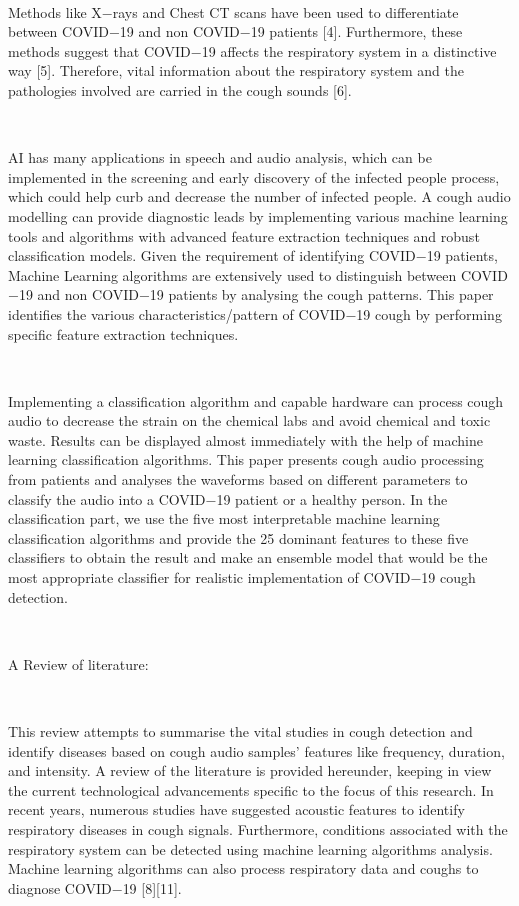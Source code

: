 \documentclass[11pt]{article}
\begin{document}
\textcolor[HTML]{0E101A}{ }

\textcolor[HTML]{0E101A}{Methods like X$-$rays and Chest CT scans have been used to differentiate between COVID$-$19 and non COVID$-$19 patients [4]. Furthermore, these methods suggest that COVID$-$19 affects the respiratory system in a distinctive way [5]. Therefore, vital information about the respiratory system and the pathologies involved are carried in the cough sounds [6].            }

\textcolor[HTML]{0E101A}{ }

\textcolor[HTML]{0E101A}{AI has many applications in speech and audio analysis, which can be implemented in the screening and early discovery of the infected people process, which could help curb and decrease the number of infected people. A cough audio modelling can provide diagnostic leads by implementing various machine learning tools and algorithms with advanced feature extraction techniques and robust classification models. Given the requirement of identifying COVID$-$19 patients, Machine Learning algorithms are extensively used to distinguish between COVID$-$19 and non COVID$-$19 patients by analysing the cough patterns. This paper identifies the various characteristics/pattern of COVID$-$19 cough by performing specific feature extraction techniques.}

\textcolor[HTML]{0E101A}{ }

\textcolor[HTML]{0E101A}{Implementing a classification algorithm and capable hardware can process cough audio to decrease the strain on the chemical labs and avoid chemical and toxic waste. Results can be displayed almost immediately with the help of machine learning classification algorithms. This paper presents cough audio processing from patients and analyses the waveforms based on different parameters to classify the audio into a COVID$-$19 patient or a healthy person. In the classification part, we use the five most interpretable machine learning classification algorithms and provide the 25 dominant features to these five classifiers to obtain the result and make an ensemble model that would be the most appropriate classifier for realistic implementation of COVID$-$19 cough detection.}

\textcolor[HTML]{0E101A}{ }

{\LARGE \textcolor[HTML]{0E101A}{A Review of literature:}}

\textcolor[HTML]{0E101A}{ }

\textcolor[HTML]{0E101A}{This review attempts to summarise the vital studies in cough detection and identify diseases based on cough audio samples' features like frequency, duration, and intensity. A review of the literature is provided hereunder, keeping in view the current technological advancements specific to the focus of this research. In recent years, numerous studies have suggested acoustic features to identify respiratory diseases in cough signals. Furthermore, conditions associated with the respiratory system can be detected using machine learning algorithms analysis. Machine learning algorithms can also process respiratory data and coughs to diagnose COVID$-$19 [8][11]. }
\end{document}
